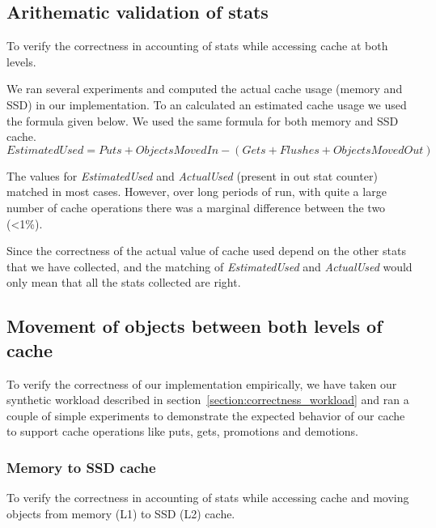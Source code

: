     \subsection{Arithematic validation of stats}
    
	    To verify the correctness in accounting of stats while accessing cache at both levels.
	    
	We ran several experiments and computed the actual cache usage (memory and SSD) in our implementation. To an calculated 
	an estimated cache usage we used the formula given below. We used the same formula for both memory and SSD cache. 
	  \begin{equation}
	    EstimatedUsed = Puts + ObjectsMovedIn - (Gets + Flushes + ObjectsMovedOut)
	  \end{equation}
      
	The values for \textit{EstimatedUsed} and \textit{ActualUsed} (present in out stat counter) matched in most cases.
	However, over long periods of run, with quite a large number of cache operations there was a marginal difference
	between the two (\textless 1\%).
	
	Since the correctness of the actual value of cache used depend on the other stats that we have collected, and the 
	matching of \textit{EstimatedUsed} and \textit{ActualUsed} would only mean that all the stats collected are right.
    
    \subsection{Movement of objects between both levels of cache}
	
	To verify the correctness of our implementation empirically, we have taken our synthetic workload described in 
	section~\ref{section:correctness_workload} and ran a couple of simple experiments to demonstrate the expected 
	behavior of our cache to support cache operations like puts, gets, promotions and demotions.  
	
	\subsubsection{Memory to SSD cache}

	    To verify the correctness in accounting of stats while accessing cache and moving objects from memory (L1) to SSD (L2) cache.
	    
